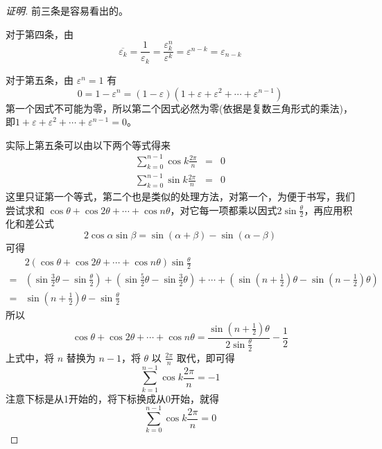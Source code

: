 \begin{proof}[证明]
  前三条是容易看出的。

  对于第四条，由
  \[ \overline{\varepsilon_k} = \frac{1}{\varepsilon_k} = \frac{\varepsilon_k^n}{\varepsilon^k} = \varepsilon^{n-k} = \varepsilon_{n-k} \]

  对于第五条，由 $\varepsilon^n=1$ 有
  \[ 0 = 1- \varepsilon^n = (1-\varepsilon)(1+\varepsilon+\varepsilon^2+\cdots+\varepsilon^{n-1}) \]
  第一个因式不可能为零，所以第二个因式必然为零(依据是复数三角形式的乘法)，即$1+\varepsilon+\varepsilon^2+\cdots+\varepsilon^{n-1}=0$。

  实际上第五条可以由以下两个等式得来
  \begin{eqnarray*}
    \sum_{k=0}^{n-1} \cos k \frac{2\pi}{n} & = & 0 \\
    \sum_{k=0}^{n-1} \sin k \frac{2\pi}{n} & = & 0
  \end{eqnarray*}
  这里只证第一个等式，第二个也是类似的处理方法，对第一个，为便于书写，我们尝试求和 $\cos\theta + \cos 2\theta + \cdots + \cos n \theta$，对它每一项都乘以因式$2\sin \frac{\theta}{2}$，再应用积化和差公式
  \[ 2\cos\alpha\sin\beta = \sin(\alpha+\beta) - \sin(\alpha-\beta) \]
  可得
  \begin{equation*}
    \begin{split}
      & 2(\cos\theta + \cos 2\theta + \cdots + \cos n \theta)\sin \frac{\theta}{2} \\
      = & \left(\sin \frac{3}{2} \theta - \sin  \frac{\theta}{2} \right) + \left(\sin \frac{5}{2}\theta - \sin \frac{3}{2}\theta \right) + \cdots + \left(\sin \left(n+\frac{1}{2}\right)\theta - \sin \left(n-\frac{1}{2}\right)\theta \right) \\
      = & \sin \left(n+\frac{1}{2}\right)\theta - \sin  \frac{\theta}{2}
    \end{split}
  \end{equation*}
  所以
  \[ \cos\theta + \cos 2\theta + \cdots + \cos n \theta = \frac{\sin \left(n+\frac{1}{2}\right)\theta}{2\sin \frac{\theta}{2}} - \frac{1}{2} \]
  上式中，将 $n$ 替换为 $n-1$，将 $\theta$ 以 $\frac{2\pi}{n}$ 取代，即可得
  \[ \sum_{k=1}^{n-1} \cos k \frac{2\pi}{n} = -1 \]
  注意下标是从1开始的，将下标换成从0开始，就得
  \[ \sum_{k=0}^{n-1} \cos k \frac{2\pi}{n} = 0 \]
\end{proof}


